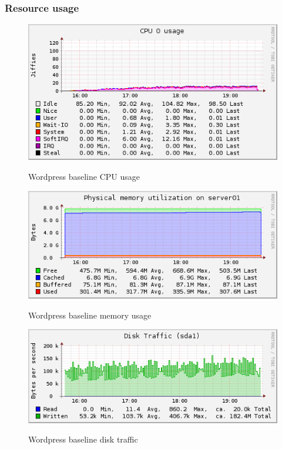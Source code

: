 \documentclass[Measurement results]{subfiles}
\begin{document}
\subsubsection{Resource usage}
\begin{figure}[H]
\centering
\caption{Wordpress baseline CPU usage}
\includegraphics[scale=0.7]{images/results/baseline_wp/cpu.png}
\label{fig:Baseline Nginx CPU usage}
\end{figure}

\begin{figure}[H]
\centering
\caption{Wordpress baseline memory usage}
\includegraphics[scale=0.7]{images/results/baseline_wp/memory.png}
\label{fig:Baseline Nginx memory usage}
\end{figure}

\begin{figure}[H]
\centering
\caption{Wordpress baseline disk traffic}
\includegraphics[scale=0.7]{images/results/baseline_wp/disk.png}
\label{fig:Baseline Nginx disk traffic}
\end{figure}
\end{document}
